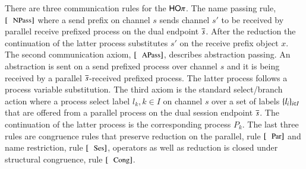 

There are three communication rules for the $\mathsf{HO}\pi$. The name passing
rule, $\orule{NPass}$ where a send prefix on channel $s$ sends
channel $s'$ to be received by parallel receive prefixed process
on the dual endpoint $\overline{s}$. After the reduction the continuation of the 
latter process substitutes $s'$ on the receive prefix object $x$.
The second communication axiom, $\orule{APass}$, describes
abstraction passing. An abstraction is sent on a send prefixed process
over channel $s$ and it is being received by a parallel $\overline{s}$-received
prefixed process. The latter process follows a process variable
substitution.
The third axiom is the standard select/branch action where
a process select label $l_k, k \in I$ on channel $s$ over a set of
labels $\{l_i\}_{i \in I}$ that are offered from a parallel process
on the dual session endpoint $\overline{s}$. The continuation of the latter
process is the corresponding process $P_k$.
The last three rules are congruence rules that preserve reduction
on the parallel, rule $\orule{Par}$ and name restriction, rule $\orule{Ses}$,
operators as well as reduction is closed under structural congruence, rule $\orule{Cong}$.



